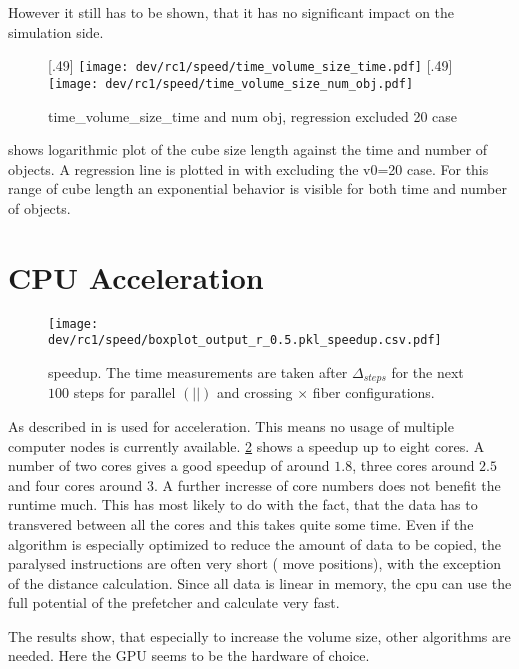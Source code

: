 However it still has to be shown, that it has no significant impact on the simulation side.
% 
% 
% 
\par
% 
\begin{figure}[!t]
\centering
{}[.49\textwidth]{
\texttt{[image: dev/rc1/speed/time\_volume\_size\_time.pdf]}}
[.49\textwidth]{
\texttt{[image: dev/rc1/speed/time\_volume\_size\_num\_obj.pdf]}}
\caption[time\_volume\_size\_time]{time\_volume\_size\_time and num obj, regression excluded 20 case}
\label{fig:timevolumeSizeTime}
\end{figure}
% 
 shows logarithmic plot of the cube size length against the time and number of objects. 
A regression line is plotted in with excluding the v0=20 case.
For this range of cube length an exponential behavior is visible for both time and number of objects.
% 
\section{CPU Acceleration}
% 
\begin{figure}[!t]
\centering
\texttt{[image: dev/rc1/speed/boxplot\_output\_r\_0.5.pkl\_speedup.csv.pdf]}
\caption[ speedup]{ speedup. The time measurements are taken after $\Delta_{\mathit{steps}}$ for the next $100$ steps for parallel $(||)$ and crossing $\times$ fiber configurations.}
\label{fig:solverSpeedup}
\end{figure}
% 
As described in \dummy{} \openmp{} is used for acceleration.
This means no usage of multiple computer nodes is currently available.
\cref{fig:solverSpeedup} shows a speedup up to eight cores.
A number of two cores gives a good speedup of around $1.8$, three cores around $2.5$ and four cores around $3$.
A further incresse of core numbers does not benefit the runtime much.
This has most likely to do with the fact, that the data has to transvered between all the cores and this takes quite some time.
Even if the algorithm is especially optimized to reduce the amount of data to be copied, the paralysed instructions are often very short (\eg{} move positions), with the exception of the distance calculation.
Since all data is linear in memory, the cpu can use the full potential of the prefetcher and calculate very fast.
\par
% 
The results show, that especially to increase the volume size, other algorithms are needed. 
Here the \ac{GPU} seems to be the hardware of choice.
% 
% 
% 
